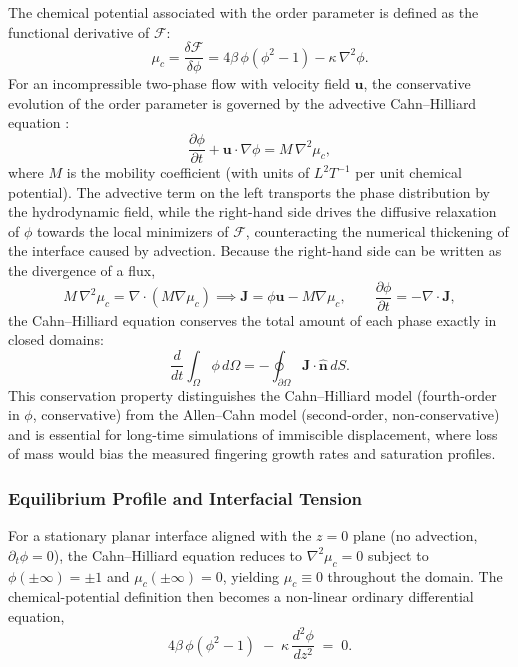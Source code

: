The chemical potential associated with the order parameter is defined as the functional derivative of $\mathcal{F}$:
\begin{equation}
    \mu_c = \frac{\delta \mathcal{F}}{\delta \phi} = 4\beta\,\phi(\phi^2 - 1) - \kappa\,\nabla^2 \phi.
\end{equation}
For an incompressible two-phase flow with velocity field $\mathbf{u}$, the conservative evolution of the order parameter is governed by the advective Cahn--Hilliard equation \cite{cahn1958free}:
\begin{equation}
    \frac{\partial \phi}{\partial t} + \mathbf{u} \cdot \nabla \phi = M\,\nabla^2 \mu_c,
\end{equation}
where $M$ is the mobility coefficient (with units of $L^2 T^{-1}$ per unit chemical potential).
The advective term on the left transports the phase distribution by the hydrodynamic field, while the right-hand side drives the diffusive relaxation of $\phi$ towards the local minimizers of $\mathcal{F}$, counteracting the numerical thickening of the interface caused by advection.
Because the right-hand side can be written as the divergence of a flux,
\begin{equation}
    M\,\nabla^2 \mu_c = \nabla \cdot \left(M \nabla \mu_c\right) \implies \mathbf{J} = \phi\mathbf{u} - M\nabla \mu_c, \qquad \frac{\partial \phi}{\partial t} = -\nabla \cdot \mathbf{J},
\end{equation}
the Cahn--Hilliard equation conserves the total amount of each phase exactly in closed domains:
\begin{equation}
    \frac{d}{dt} \int_{\Omega} \phi\, d\Omega = -\oint_{\partial \Omega} \mathbf{J} \cdot \hat{\mathbf{n}}\, dS.
\end{equation}
This conservation property distinguishes the Cahn--Hilliard model (fourth-order in $\phi$, conservative) from the Allen--Cahn model (second-order, non-conservative) and is essential for long-time simulations of immiscible displacement, where loss of mass would bias the measured fingering growth rates and saturation profiles.

\subsubsection{Equilibrium Profile and Interfacial Tension}
\label{sec:equilibrium-profile}

For a stationary planar interface aligned with the $z = 0$ plane (no advection, $\partial_t \phi = 0$), the Cahn--Hilliard equation reduces to $\nabla^2 \mu_c = 0$ subject to $\phi(\pm \infty) = \pm 1$ and $\mu_c(\pm\infty) = 0$, yielding $\mu_c \equiv 0$ throughout the domain.
The chemical-potential definition then becomes a non-linear ordinary differential equation,
\begin{equation}
\label{eq:CH-equilibrium-ODE}
4\beta\,\phi(\phi^2 - 1) \;-\; \kappa\,\frac{d^2 \phi}{dz^2} \;=\; 0.
\end{equation}

